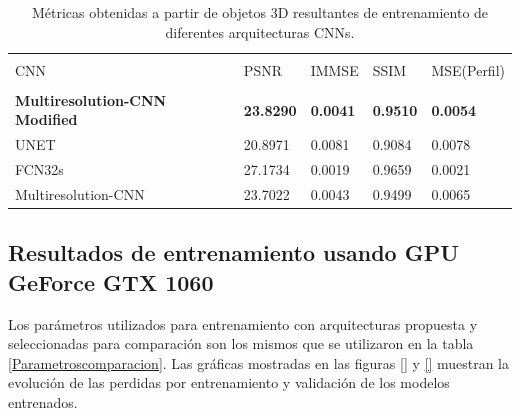 \documentclass[10pt,letterpaper]{article}
\begin{document}
\begin{table}[H]
\caption{Métricas obtenidas a partir de objetos 3D resultantes de entrenamiento de diferentes arquitecturas CNNs.}
\begin{center}
\begin{tabular}{p{2.5cm}p{1.5cm}p{1.5cm}p{1.5cm}p{1.5cm}}
\hline\\
CNN & PSNR & IMMSE & SSIM & MSE(Perfil) \\
\hline\\
\textbf{Multiresolution-CNN Modified}  & \textbf{23.8290} & \textbf{0.0041} & \textbf{0.9510} & \textbf{0.0054} \\
UNET                & 20.8971 & 0.0081 & 0.9084 & 0.0078 \\
FCN32s              & 27.1734 & 0.0019 & 0.9659 & 0.0021 \\
Multiresolution-CNN & 23.7022 & 0.0043 & 0.9499 & 0.0065 \\[2pt]
\hline
\end{tabular}
\label{tabla1}
\end{center}
\end{table}


\subsection*{Resultados de entrenamiento usando GPU GeForce GTX 1060}
Los parámetros utilizados para entrenamiento con arquitecturas propuesta y seleccionadas para comparación son los mismos que se utilizaron en la tabla \ref{Parametroscomparacion}. Las gráficas mostradas en las figuras \ref{} y \ref{} muestran la evolución de las perdidas por entrenamiento y validación de los modelos entrenados.
\end{document}
